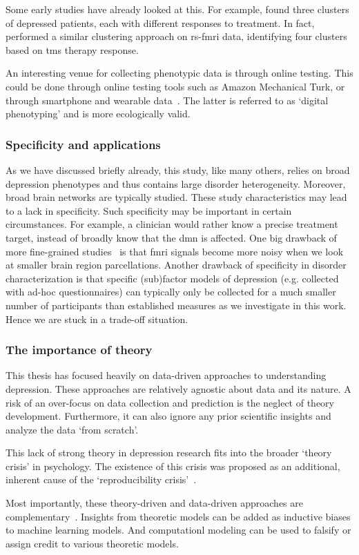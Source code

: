 Some early studies have already looked at this.
For example, \textcite{Chekroud2017} found three clusters of depressed patients, each with different responses to treatment.
In fact, \textcite{Drysdale2017} performed a similar clustering approach on \gls{rs-fmri} data, identifying four clusters based on \gls{tms} therapy response.

An interesting venue for collecting phenotypic data is through online testing.
This could be done through online testing tools such as Amazon Mechanical Turk, or through smartphone and wearable data~\parencite[see e.g.][]{Shapiro2013, Brown2014b}.
The latter is referred to as `digital phenotyping' and is more ecologically valid.

\subsubsection{Specificity and applications}

As we have discussed briefly already, this study, like many others, relies on broad depression phenotypes and thus contains large disorder heterogeneity.
Moreover, broad brain networks are typically studied.
These study characteristics may lead to a lack in specificity.
Such specificity may be important in certain circumstances.
For example, a clinician would rather know a precise treatment target, instead of broadly know that the \gls{dmn} is affected.
One big drawback of more fine-grained studies~\parencite[e.g.][]{Klein-Flamp2022} is that \gls{fmri} signals become more noisy when we look at smaller brain region parcellations.
Another drawback of specificity in disorder characterization is that specific (sub)factor models of depression (e.g. collected with ad-hoc questionnaires) can typically only be collected for a much smaller number of participants than established measures as we investigate in this work.
Hence we are stuck in a trade-off situation.

\subsubsection{The importance of theory}

This thesis has focused heavily on data-driven approaches to understanding depression.
These approaches are relatively agnostic about data and its nature.
A risk of an over-focus on data collection and prediction is the neglect of theory development.
Furthermore, it can also ignore any prior scientific insights and analyze the data `from scratch'.

This lack of strong theory in depression research fits into the broader `theory crisis' in psychology.
The existence of this crisis was proposed as an additional, inherent cause of the `reproducibility crisis'~\parencite{Oberauer2019, Eronen2021}.

Most importantly, these theory-driven and data-driven approaches are complementary~\parencite{Huys2016}.
Insights from theoretic models can be added as inductive biases to machine learning models.
And computationl modeling can be used to falsify or assign credit to various theoretic models.

